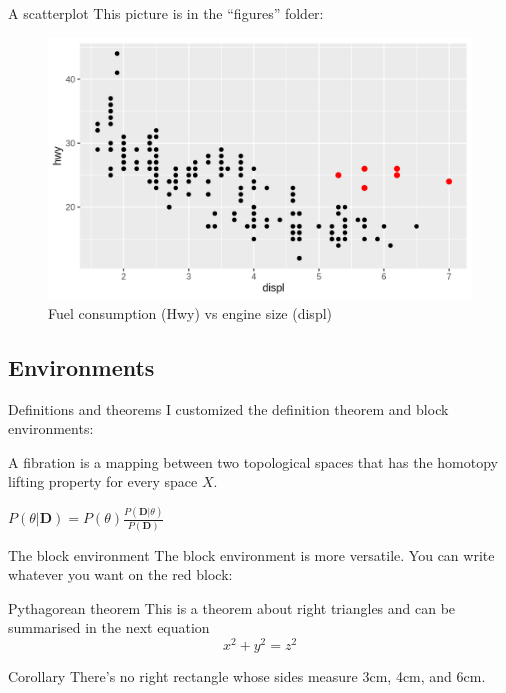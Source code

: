 
\begin{frame}{A scatterplot}
	This picture is in the ``figures'' folder:
	\begin{figure}
	\includegraphics[scale=.5]{figures/graph.png}
	\caption{Fuel consumption (Hwy) vs engine size (displ)}
	\end{figure}
\end{frame}

\subsection{Environments}


\begin{frame}{Definitions and theorems}
	I customized the definition theorem and block environments:
	\begin{definition}[Fibration]
	A fibration is a mapping between two topological spaces that has the homotopy lifting property for every space $X$.
	\end{definition}
	\begin{theorem}[Bayes]
	$P(\theta|\textbf{D}) = P(\theta ) \frac{P(\textbf{D} |\theta)}{P(\textbf{D})}$
	\end{theorem}
\end{frame}

\begin{frame}{The block environment}
	The block environment is more versatile. You can write whatever you want on the red block:
	\begin{block}{Pythagorean theorem}
	This is a theorem about right triangles and can be summarised in the next 
	equation 
	\[ x^2 + y^2 = z^2 \]
	\end{block}
	\begin{block}{Corollary}
	There's no right rectangle whose sides measure 3cm, 4cm, and 6cm.
	\end{block}
\end{frame}


